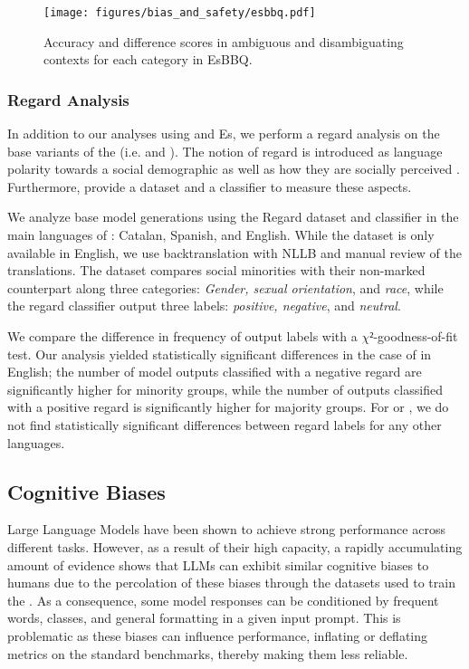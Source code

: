 \begin{figure*}[htb!]
    \centering
    \texttt{[image: figures/bias\_and\_safety/esbbq.pdf]}
    \caption{Accuracy and difference scores in ambiguous and disambiguating contexts for each category in EsBBQ.}
    \label{fig:esbbq}
\end{figure*}

\subsubsection{Regard Analysis}
In addition to our analyses using \BBQ{} and Es\BBQ{}, we perform a regard analysis on the base variants of the \SalamandraFamily{} (i.e. \SalamandraBaseII{} and \SalamandraBaseVII{}). The notion of regard is introduced as language polarity towards a social demographic as well as how they are socially perceived \cite{sheng-regard}. Furthermore, \citet{sheng-regard} provide a dataset and a classifier to measure these aspects.

We analyze base model generations using the Regard dataset and classifier in the main languages of \Salamandra{}: Catalan, Spanish, and English. While the dataset is only available in English, we use backtranslation with NLLB \cite{nllb_language_2022} and manual review of the translations. The dataset compares social minorities with their non-marked counterpart along three categories: \textit{Gender, sexual orientation}, and \textit{race}, while the regard classifier output three labels: \textit{positive, negative}, and \textit{neutral}.

We compare the difference in frequency of output labels with a $\chi²$-goodness-of-fit test. Our analysis yielded statistically significant differences in the case of \SalamandraBaseII{} in English; the number of model outputs classified with a negative regard are significantly higher for minority groups, while the number of outputs classified with a positive regard is significantly higher for majority groups. For \SalamandraBaseII{} or \SalamandraBaseVII{}, we do not find statistically significant differences between regard labels for any other languages.

\subsection{Cognitive Biases}

Large Language Models have been shown to achieve strong performance across different tasks. However, as a result of their high capacity, 
a rapidly accumulating amount of evidence shows that LLMs can exhibit similar cognitive biases to humans due to the percolation of these biases through the datasets used to train the \LLM{} \cite{petroni-etal-2019-language, lu-etal-2022-fantastically, Zhao2021CalibrateBU, weber-etal-2023-mind}. As a consequence, some model responses can be conditioned by frequent words, classes, and general formatting in a given input prompt. This is problematic as these biases can influence performance, inflating or deflating metrics on the standard benchmarks, thereby making them less reliable. 


